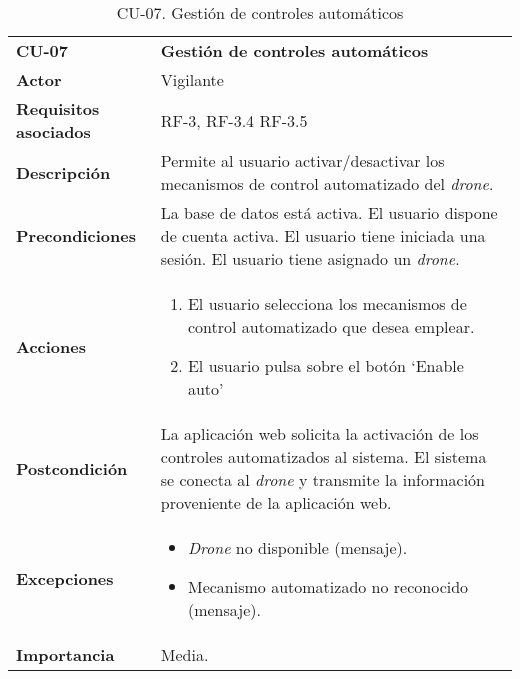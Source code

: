 \begin{table}[H]
	\begin{center}
		\begin{tabular}{m{3cm}  m{10cm}}\hline
			\toprule
			\textbf{CU-07} & \textbf{Gestión de controles automáticos}\\
			\otoprule
			\textbf{Actor} & Vigilante\\
			\textbf{Requisitos asociados} & RF-3, RF-3.4 RF-3.5\\
			\textbf{Descripción} & Permite al usuario activar/desactivar los mecanismos de control automatizado del \emph{drone}.\\
			\textbf{Precondiciones} & La base de datos está activa. El usuario dispone de cuenta activa. El usuario tiene iniciada una sesión. El usuario tiene asignado un \emph{drone}.\\
			\textbf{Acciones} & \begin{enumerate}
											\item El usuario selecciona los mecanismos de control automatizado que desea emplear.
											\item El usuario pulsa sobre el botón `Enable auto'
											\end{enumerate}\\
											
			\textbf{Postcondición} & La aplicación web solicita la activación de los controles automatizados al sistema. El sistema se conecta al \emph{drone} y transmite la información proveniente de la aplicación web.\\
			\textbf{Excepciones} & \begin{itemize}
												\item \emph{Drone} no disponible (mensaje).
												\item Mecanismo automatizado no reconocido (mensaje).
												\end{itemize}\\
			\textbf{Importancia} & Media.\\
			\hline
			\bottomrule
		\end{tabular}
		\caption{CU-07. Gestión de controles automáticos}
		\label{tb:CU07}
	\end{center}
\end{table}


